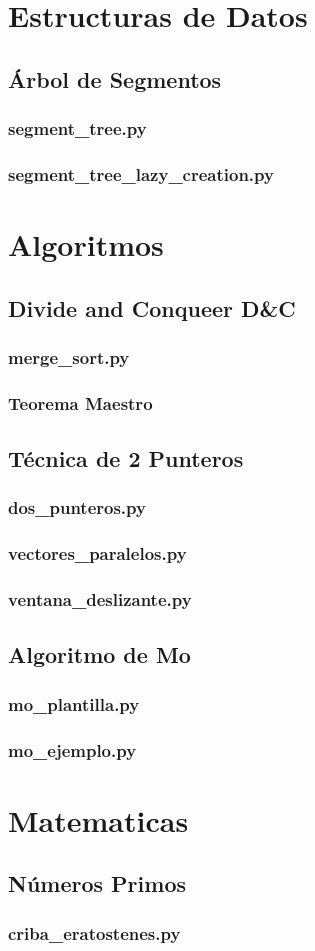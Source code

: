\documentclass{article}
\newcommand\codefile[2]{    
    \subsubsection{#2}
    
    
}
\begin{document}
\begin{multicols*}{2}
\section{Estructuras de Datos}

\subsection{Árbol de Segmentos}
\codefile{estructuras\_de\_datos/segment\_tree.py}{segment\_tree.py}
\codefile{estructuras\_de\_datos/segment\_tree\_lazy\_creation.py}{segment\_tree\_lazy\_creation.py}

\section{Algoritmos}

\subsection{Divide and Conqueer D\&C}
\codefile{algoritmos/mergesort.py}{merge\_sort.py}
\subsubsection{Teorema Maestro}


\subsection{Técnica de 2 Punteros}
\codefile{algoritmos/dos_punteros.py}{dos\_punteros.py}
\codefile{algoritmos/vectores_paralelos.py}{vectores\_paralelos.py}
\codefile{algoritmos/ventana_deslizante.py}{ventana\_deslizante.py} 

\subsection{Algoritmo de Mo}
\codefile{algoritmos/mo_plantilla.py}{mo\_plantilla.py}
\codefile{algoritmos/mo_ejemplo.py}{mo\_ejemplo.py}

\section{Matematicas}

\subsection{Números Primos}
\codefile{matematicas/criba_eratostenes.py}{criba\_eratostenes.py}



\end{multicols*}
\end{document}
